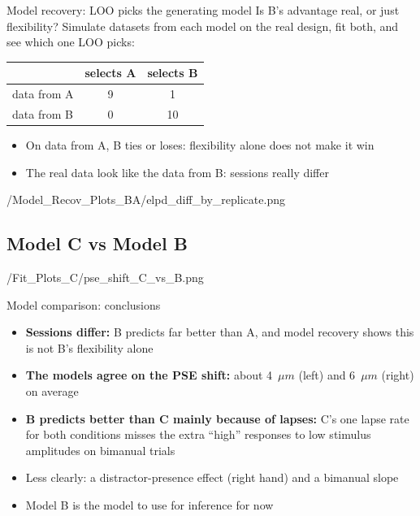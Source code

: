 \begin{frame}{Model recovery: LOO picks the generating model}
  Is B's advantage real, or just flexibility? Simulate datasets from each model on the real
  design, fit both, and see which one LOO picks:
  \vspace{0.6em}

  \centering
  \begin{tabular}{lcc}
    \toprule
     & selects A & selects B \\
    \midrule
    data from A & 9 & 1 \\
    data from B & 0 & 10 \\
    \bottomrule
  \end{tabular}

  \vspace{0.6em}
  \raggedright
  \begin{itemize}
    \item On data from A, B ties or loses: flexibility alone does not make it win
    \item The real data look like the data from B: sessions really differ
  \end{itemize}
\end{frame}

  {\plotsB/Model_Recov_Plots_BA/elpd_diff_by_replicate.png}

\subsection{Model C vs Model B}

  {\plotsC/Fit_Plots_C/pse_shift_C_vs_B.png}

\begin{frame}{Model comparison: conclusions}
  \begin{itemize}
    \item \textbf{Sessions differ:} B predicts far better than A, and model recovery shows this
          is not B's flexibility alone
    \item \textbf{The models agree on the PSE shift:} about 4~$\mu m$ (left) and 6~$\mu m$
          (right) on average
    \item \textbf{B predicts better than C mainly because of lapses:} C's one lapse rate for
          both conditions misses the extra ``high'' responses to low stimulus amplitudes on bimanual
          trials
    \item Less clearly: a distractor-presence effect (right hand) and a bimanual slope
    \item[$\Rightarrow$] Model B is the model to use for inference for now
  \end{itemize}
\end{frame}
